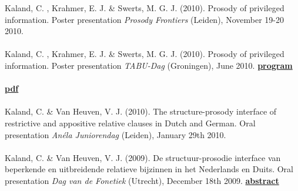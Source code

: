 \documentclass[a4paper,11pt]{article}
\begin{document}
Kaland, C. , Krahmer, E. J. \& Swerts, M. G. J. (2010). Prosody of privileged information. Poster presentation \textit{Prosody Frontiers} (Leiden), November 19-20 2010.\\\\
Kaland, C. , Krahmer, E. J. \& Swerts, M. G. J. (2010). Prosody of privileged information. Poster presentation \textit{TABU-Dag} (Groningen), June 2010. \textcolor{red}{\textbf{\lbrack\href{http://www.let.rug.nl/tabudag/archive/2010/accepted_abstracts_tabudag_2010.pdf}{program}\rbrack}}\\\\
 \textcolor{red}{\textbf{\lbrack\href{https://www.isca-speech.org/archive/sp2010/papers/sp10_064.pdf}{pdf}\rbrack}}\\\\
Kaland, C. \& Van Heuven, V. J. (2010). The structure-prosody interface of restrictive and appositive relative clauses in Dutch and German. Oral presentation \textit{An\'ela Juniorendag} (Leiden), January 29th 2010.\\\\
Kaland, C. \& Van Heuven, V. J. (2009). De structuur-prosodie interface van beperkende en uitbreidende relatieve bijzinnen in het Nederlands en Duits. Oral presentation \textit{Dag van de Fonetiek} (Utrecht), December 18th 2009. \textcolor{red}{\textbf{\lbrack\href{http://www.fon.hum.uva.nl/FonetischeVereniging/DvdFonetiek/DagvdFonetiek2009abstracts.html\#10:40}{abstract}\rbrack}}\\\\\

\vspace{-5mm}
\end{document}
